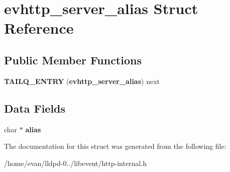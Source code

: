 \section{evhttp\-\_\-server\-\_\-alias \-Struct \-Reference}
\label{structevhttp__server__alias}
\subsection*{\-Public \-Member \-Functions}
\begin{DoxyCompactItemize}
\item 
{\bfseries \-T\-A\-I\-L\-Q\-\_\-\-E\-N\-T\-R\-Y} ({\bf evhttp\-\_\-server\-\_\-alias}) next\label{structevhttp__server__alias_af799a7637fa2f4dd87b620245e2c7341}

\end{DoxyCompactItemize}
\subsection*{\-Data \-Fields}
\begin{DoxyCompactItemize}
\item 
char $\ast$ {\bfseries alias}\label{structevhttp__server__alias_a9027b352db4085a0122952932d065705}

\end{DoxyCompactItemize}


\-The documentation for this struct was generated from the following file\-:\begin{DoxyCompactItemize}
\item 
/home/evan/lldpd-\/0../libevent/http-\/internal.\-h\end{DoxyCompactItemize}
